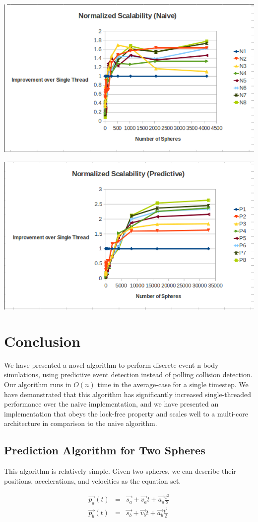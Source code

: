 \documentclass[conference]{IEEEtran}
\begin{document}
\begin{center}
	\includegraphics[width=.45\textwidth]{normalized_scalability_naive.png}
\end{center}

\begin{center}
	\includegraphics[width=.45\textwidth]{normalized_scalability_predictive.png}
\end{center}

\section{Conclusion} 

We have presented a novel algorithm to perform discrete event n-body simulations, using predictive event detection instead of polling collision detection.  Our algorithm runs in $O(n)$ time in the average-case for a single timestep.  We have demonstrated that this algorithm has significantly increased single-threaded performance over the naive implementation, and we have presented an implementation that obeys the lock-free property and scales well to a multi-core architecture in comparison to the naive algorithm.




\appendix %
\subsection{Prediction Algorithm for Two Spheres}
\label{predict}
This algorithm is relatively simple.  Given two spheres, we can describe their positions, accelerations, and velocities as the equation set.

\begin{eqnarray*}
\vec{p_a}(t)&=&\vec{s_a}+\vec{v_a} t+\vec{a_a} \frac{t ^ 2}{2} \\
\vec{p_b}(t)&=&\vec{s_b}+\vec{v_b} t+\vec{a_b} \frac{t ^ 2}{2} \\
\end{eqnarray*}
\end{document}
